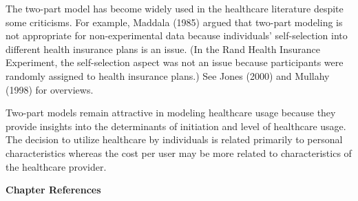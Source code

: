 The two-part model has become widely used in the healthcare
literature despite some criticisms. For example, Maddala (1985)
argued that two-part modeling is not appropriate for
non-experimental data because individuals' self-selection into
different health insurance plans is an issue. (In the Rand Health
Insurance Experiment, the self-selection aspect was not an issue
because participants were randomly assigned to health insurance
plans.) See Jones (2000) and Mullahy (1998) for overviews.

Two-part models remain attractive in modeling healthcare usage
because they provide insights into the determinants of initiation
and level of healthcare usage. The decision to utilize healthcare by
individuals is related primarily to personal characteristics whereas
the cost per user may be more related to characteristics of the
healthcare provider.


\bigskip

\textbf{Chapter References}

